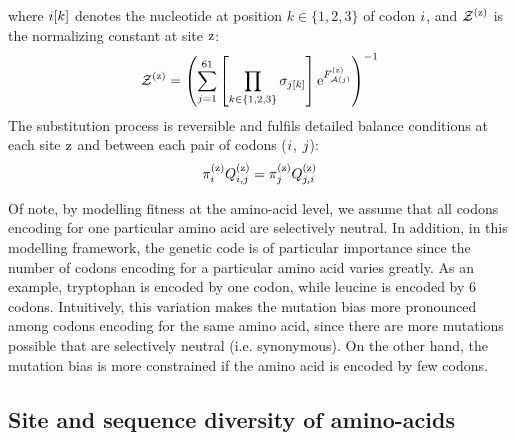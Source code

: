 where ${i}[k]$ denotes the nucleotide at position $k \in \{ 1, 2, 3 \}$ of codon ${i}$, and $\mathcal{Z}^{(\text{z})} $ is the normalizing constant at site $\text{z}$:
\begin{align}
    \mathcal{Z}^{(\text{z})} = \left( \sum\limits_{{j}=1}^{61} \left[\prod\limits_{k \in \{ 1, 2, 3 \}} \sigma_{{j}[k]}\right] \text{e}^{F_{\mathcal{A}({j})}^{(\text{z})}} \right)^{-1}
\end{align}
The substitution process is reversible and fulfils detailed balance conditions at each site $\text{z}$ and between each pair of codons (${i}$, ${j}$):
\begin{align}
    \pi_{{i}}^{(\text{z})} Q_{{i}, {j}}^{(\text{z})} = \pi_{{j}}^{(\text{z})} Q_{{j}, {i}}^{(\text{z})}
    \label{codonSubBalance}
\end{align}

Of note, by modelling fitness at the amino-acid level, we assume that all codons encoding for one particular amino acid are selectively neutral.
In addition, in this modelling framework, the genetic code is of particular importance since the number of codons encoding for a particular amino acid varies greatly.
As an example, tryptophan is encoded by one codon, while leucine is encoded by 6 codons.
Intuitively, this variation makes the mutation bias more pronounced among codons encoding for the same amino acid, since there are more mutations possible that are selectively neutral (i.e. synonymous).
On the other hand, the mutation bias is more constrained if the amino acid is encoded by few codons.

\subsection{Site and sequence diversity of amino-acids}
\label{subsec:entropy}

